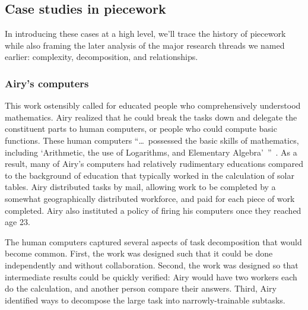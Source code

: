 \documentclass[trackingWork]{subfiles}
\begin{document}
\subsection{Case studies in piecework}
In introducing these cases at a high level,
we'll trace the history of piecework
while also framing the later analysis of the major research threads we named earlier: complexity, decomposition, and relationships.

\subsubsection{Airy's computers}

\begin{comment}
What did I pull from the threads that are related to industrial and railroad workers (i.e. 1920 onward?)

- Airy and his human computers were great:
  - quickly verifiable
  - independent tasks (could be checked without the whole product)
  - narrowly trainable

\end{comment}

This work ostensibly called for educated people who comprehensively understood mathematics.
Airy realized that he could break the tasks down and delegate the constituent parts
to human computers, or people who could compute basic functions.
These human computers ``\dots~possessed the basic skills of mathematics,
including `Arithmetic, the use of Logarithms, and Elementary Algebra'~''~\cite{grier2013computers}.
As a result, many of Airy's computers had relatively rudimentary educations
compared to the background of education that typically worked in the calculation of solar tables.
Airy distributed tasks by mail,
allowing work to be completed by a somewhat geographically distributed workforce,
and paid for each piece of work completed.
Airy also instituted a policy of firing his computers once they reached age 23.

The human computers captured several aspects of task decomposition that would become common. 
First, the work was designed such that it could be done independently and without collaboration. 
Second, the work was designed so that intermediate results could be quickly verified: Airy would have two workers each do the calculation, and another person compare their answers.
Third, Airy identified ways to decompose the large task into narrowly-trainable subtasks.
\end{document}
